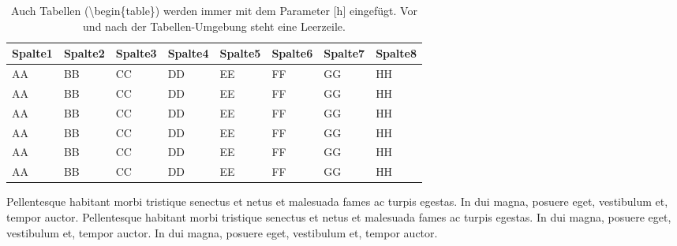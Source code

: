
\begin{table}[h] %
	\caption{Auch Tabellen (\glqq \textbackslash begin\{table\}\grqq{}) werden immer mit dem Parameter [h] eingefügt. Vor und nach der Tabellen-Umgebung steht eine Leerzeile.}
	\begin{tabularx}{\textwidth}{XXXXXXXX} \toprule
		Spalte1 & Spalte2 & Spalte3 & Spalte4 & Spalte5
		& Spalte6 & Spalte7 & Spalte8 \\ \midrule
		AA      & BB      & CC      & DD      &
		EE      & FF      & GG      & HH       \\
		AA      & BB      & CC      & DD
		& EE      & FF      & GG      & HH    \\
		AA      & BB      & CC      & DD
		& EE      & FF      & GG      & HH    \\
		AA      & BB      & CC      & DD
		& EE      & FF      & GG      & HH    \\
		AA      & BB      & CC      & DD
		& EE      & FF      & GG      & HH    \\
		AA      & BB      & CC      & DD
		& EE      & FF      & GG      & HH     \\ \bottomrule
	\end{tabularx}
\end{table}

Pellentesque habitant morbi tristique senectus et netus et malesuada fames ac turpis egestas. In dui magna, posuere eget, vestibulum et, tempor auctor. Pellentesque habitant morbi tristique senectus et netus et malesuada fames ac turpis egestas. In dui magna, posuere eget, vestibulum et, tempor auctor. In dui magna, posuere eget, vestibulum et, tempor auctor.
